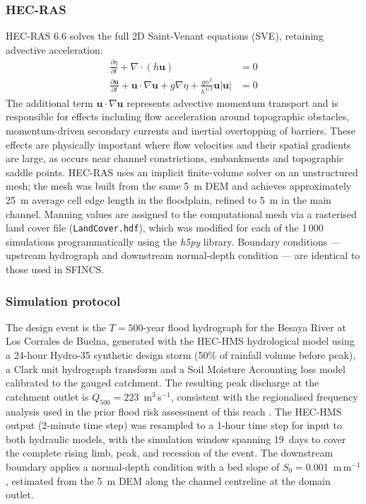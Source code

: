 \documentclass[review,12pt]{elsarticle}
\newcommand{\sfincs}{\textsc{SFINCS}}
\newcommand{\hecras}{\textsc{HEC-RAS}}
\begin{document}
\subsubsection{\hecras{}}
\hecras{} 6.6 \citep{usace2021hecras} solves the full 2D Saint-Venant
equations (SVE), retaining advective acceleration:
\begin{align}
  \frac{\partial \eta}{\partial t} + \nabla\cdot(h\mathbf{u}) &= 0 \\
  \frac{\partial \mathbf{u}}{\partial t} +
  \mathbf{u}\cdot\nabla\mathbf{u} + g\nabla\eta +
  \frac{g n^2}{h^{4/3}}\mathbf{u}|\mathbf{u}| &= 0
\end{align}
The additional term $\mathbf{u}\cdot\nabla\mathbf{u}$ represents advective
momentum transport and is responsible for effects including flow acceleration
around topographic obstacles, momentum-driven secondary currents and inertial
overtopping of barriers.
These effects are physically important where flow velocities and their spatial
gradients are large, as occurs near channel constrictions, embankments and
topographic saddle points.
\hecras{} uses an implicit finite-volume solver on an unstructured mesh;
the mesh was built from the same 5~m DEM and achieves approximately 25~m
average cell edge length in the floodplain, refined to 5~m in the main channel.
Manning values are assigned to the computational mesh via a rasterised land
cover file (\texttt{LandCover.hdf}), which was modified for each of the
1\,000 simulations programmatically using the \textit{h5py} library.
Boundary conditions --- upstream hydrograph and downstream normal-depth
condition --- are identical to those used in \sfincs{}.

\subsubsection{Simulation protocol}
The design event is the $T = 500$-year flood hydrograph for the
Besaya River at Los Corrales de Buelna, generated with the HEC-HMS hydrological
model using a 24-hour Hydro-35 synthetic design storm (50\% of rainfall volume
before peak), a Clark unit hydrograph transform and a Soil Moisture Accounting
loss model calibrated to the gauged catchment.
The resulting peak discharge at the catchment outlet is
$Q_{500} = 223$~m$^3$\,s$^{-1}$, consistent with the regionalised frequency
analysis used in the prior flood risk assessment of this reach \citep{navas2018rop}.
The HEC-HMS output (2-minute time step) was resampled to a 1-hour time step
for input to both hydraulic models, with the simulation window spanning 19~days
to cover the complete rising limb, peak, and recession of the event.
The downstream boundary applies a normal-depth condition with a
bed slope of $S_0 = 0.001$~m\,m$^{-1}$, estimated from the 5~m DEM
along the channel centreline at the domain outlet.
\end{document}
